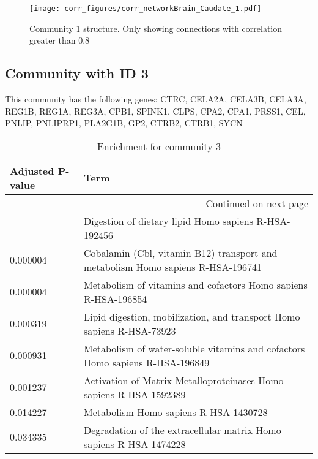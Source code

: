 \begin{figure}[h!]
\centering
\texttt{[image: corr\_figures/corr\_networkBrain\_Caudate\_1.pdf]}
\caption{Community 1 structure. Only showing connections with correlation greater than 0.8}
\end{figure}




\subsection*{Community with ID 3}
This community has the following genes: CTRC, CELA2A, CELA3B, CELA3A, REG1B, REG1A, REG3A, CPB1, SPINK1, CLPS, CPA2, CPA1, PRSS1, CEL, PNLIP, PNLIPRP1, PLA2G1B, GP2, CTRB2, CTRB1, SYCN
\\
\begin{longtable}{p{2.4cm}p{14.5cm}}
\caption{Enrichment for community 3}\\
\toprule
Adjusted \newline P-value &                                                                             Term \\
\midrule
\endhead
\midrule
\multicolumn{2}{r}{{Continued on next page}} \\
\midrule
\endfoot

\bottomrule
\endlastfoot
                 0.000003 &                             Digestion of dietary lipid Homo sapiens R-HSA-192456 \\
                 0.000004 &  Cobalamin (Cbl, vitamin B12) transport and metabolism Homo sapiens R-HSA-196741 \\
                 0.000004 &                   Metabolism of vitamins and cofactors Homo sapiens R-HSA-196854 \\
                 0.000319 &            Lipid digestion, mobilization, and transport Homo sapiens R-HSA-73923 \\
                 0.000931 &     Metabolism of water-soluble vitamins and cofactors Homo sapiens R-HSA-196849 \\
                 0.001237 &               Activation of Matrix Metalloproteinases Homo sapiens R-HSA-1592389 \\
                 0.014227 &                                            Metabolism Homo sapiens R-HSA-1430728 \\
                 0.034335 &               Degradation of the extracellular matrix Homo sapiens R-HSA-1474228 \\
\end{longtable}


